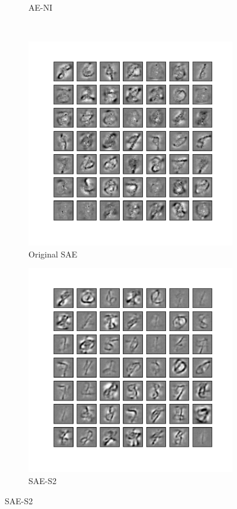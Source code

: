 \begin{figure}
\begin{subfigure}[t]{0.4\textwidth}
		\caption{AE-NI}
	\end{subfigure}\\
	\begin{subfigure}[t]{0.4\textwidth}
		\includegraphics[width=\textwidth]{pics_sdlm/40_MNIST_SAE_original/2_60000_0.pdf}
		\caption{Original SAE}
	\end{subfigure}
	\begin{subfigure}[t]{0.4\textwidth}
		\includegraphics[width=\textwidth]{pics_sdlm/42_MNIST_SAE_noise/2_60000_0.pdf}
		\caption{SAE-S2}


\end{subfigure}
\end{figure}
